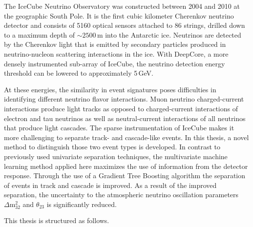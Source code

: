 The IceCube Neutrino Observatory  was constructed between 2004 and 2010 at the geographic South Pole.
It is the first cubic kilometer Cherenkov neutrino detector and consists of 5160 optical sensors attached to 86 strings, drilled down to a maximum depth of $\sim2500$\,m into the Antarctic ice.
Neutrinos are detected by the Cherenkov light that is emitted by secondary particles produced in neutrino-nucleon scattering interactions in the ice.
With DeepCore, a more densely instrumented sub-array of IceCube, the neutrino detection energy threshold can be lowered to approximately 5\,GeV.

At these energies, the similarity in event signatures poses difficulties in identifying different neutrino flavor interactions.
Muon neutrino charged-current interactions produce light tracks as opposed to charged-current interactions of electron and tau neutrinos as well as neutral-current interactions of all neutrinos that produce light cascades.
The sparse instrumentation of IceCube makes it more challenging to separate track- and cascade-like events.
In this thesis, a novel method to distinguish those two event types is developed.
In contrast to previously used univariate separation techniques, the multivariate machine learning method applied here maximizes the use of information from the detector response.
Through the use of a Gradient Tree Boosting algorithm the separation of events in track and cascade is improved.
As a result of the improved separation, the uncertainty to the atmospheric neutrino oscillation parameters $\Delta \mathrm{m}^{2}_{32}$ and $\theta_{23}$ is significantly reduced.

This thesis is structured as follows. 

